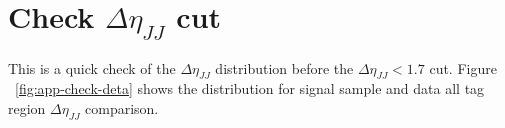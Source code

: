 \section{Check $\Delta \eta_{JJ}$ cut }
\label{app:check-deta}

This is a quick check of the $\Delta \eta_{JJ}$ distribution before the $\Delta \eta_{JJ} < 1.7$ cut. Figure ~\ref{fig:app-check-deta} shows the distribution for signal sample and data all tag region $\Delta \eta_{JJ}$ comparison.

\begin{figure*}[htbp!]
\begin{center}
  \caption{ $\Delta \eta_{JJ}$ distribution in signal MC and data. Distributions are drawn normalized to compare. The QCD multijet tends to have a large tail in $\Delta \eta_{JJ}$ distribution.}
\label{fig:app-check-deta}
\end{center}
\end{figure*}
